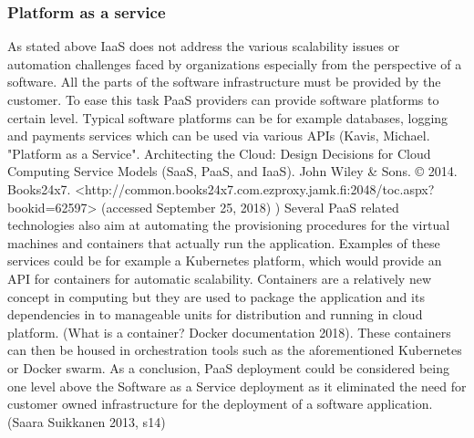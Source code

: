 \documentclass{article}
\begin{document}
\subsubsection{Platform as a service}
As stated above IaaS does not address the various scalability issues or automation challenges faced by organizations especially from the perspective of a software. All the parts of the software infrastructure must be provided by the customer. To ease this task PaaS providers can provide software platforms to certain level. Typical software platforms can be for example databases, logging and payments services which can be used via various APIs (Kavis, Michael. "Platform as a Service". Architecting the Cloud: Design Decisions for Cloud Computing Service Models (SaaS, PaaS, and IaaS). John Wiley \& Sons. © 2014. Books24x7. <http://common.books24x7.com.ezproxy.jamk.fi:2048/toc.aspx?bookid=62597> (accessed September 25, 2018) )
Several PaaS related technologies also aim at automating the provisioning procedures for the virtual machines and containers that actually run the application. Examples of these services could be for example a Kubernetes platform, which would provide an API for containers for automatic scalability. Containers are a relatively new concept in computing but they are used to package the application and its dependencies in to manageable units for distribution and running in cloud platform. (What is a container? Docker documentation 2018). These containers can then be housed in orchestration tools such as the aforementioned Kubernetes or Docker swarm.
As a conclusion, PaaS deployment could be considered being one level above the Software as a Service deployment as it eliminated the need for customer owned infrastructure for the deployment of a software application. (Saara Suikkanen 2013, s14)
\end{document}
